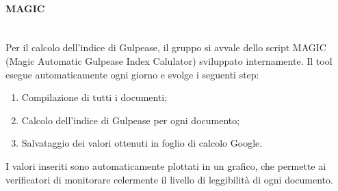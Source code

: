 \paragraph{MAGIC}\mbox{}\\
Per il calcolo dell'indice di Gulpease, il gruppo \gruppo \space si avvale dello script MAGIC (Magic Automatic Gulpease Index Calulator) sviluppato internamente.
Il tool esegue automaticamente ogni giorno e svolge i seguenti step:
\begin{enumerate}
	\item Compilazione di tutti i documenti;
	\item Calcolo dell'indice di Gulpease per ogni documento;
	\item Salvataggio dei valori ottenuti in foglio di calcolo Google.
\end{enumerate}
I valori inseriti sono automaticamente plottati in un grafico, che permette ai verificatori di monitorare celermente il livello di leggibilità di ogni documento.

